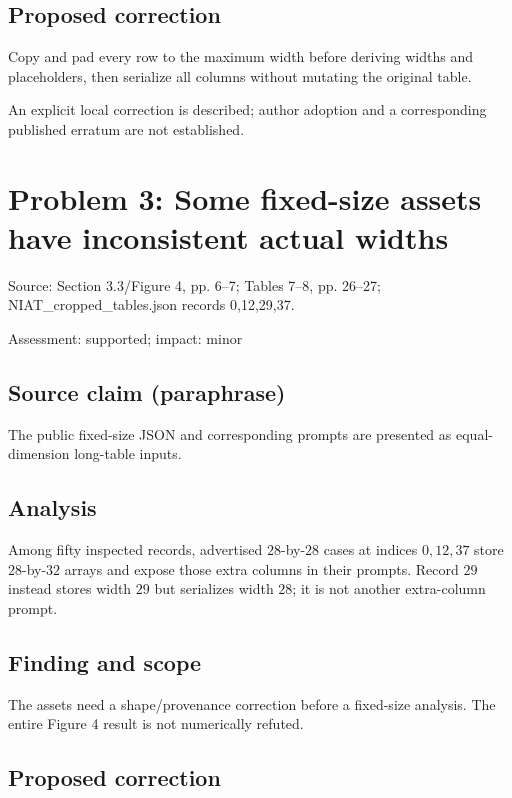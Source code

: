 \documentclass[11pt]{article}
\begin{document}
\subsection*{Proposed correction}

Copy and pad every row to the maximum width before deriving widths and placeholders, then serialize all columns without mutating the original table.

An explicit local correction is described; author adoption and a corresponding published erratum are not established.

\section*{Problem 3: Some fixed-size assets have inconsistent actual widths}

Source: Section 3.3/Figure 4, pp. 6–7; Tables 7–8, pp. 26–27; NIAT\_cropped\_tables.json records 0,12,29,37.

Assessment: supported; impact: minor

\subsection*{Source claim (paraphrase)}

The public fixed-size JSON and corresponding prompts are presented as equal-dimension long-table inputs.

\subsection*{Analysis}

Among fifty inspected records, advertised \(28\)-by-\(28\) cases at indices \(0,12,37\) store \(28\)-by-\(32\) arrays and expose those extra columns in their prompts. Record \(29\) instead stores width \(29\) but serializes width \(28\); it is not another extra-column prompt.

\subsection*{Finding and scope}

The assets need a shape/provenance correction before a fixed-size analysis. The entire Figure 4 result is not numerically refuted.

\subsection*{Proposed correction}
\end{document}
